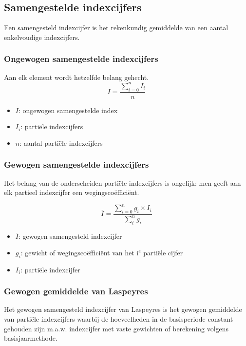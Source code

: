\documentclass[a4paper,12pt]{article}
\begin{document}
\subsection{Samengestelde indexcijfers}
Een samengesteld indexcijfer is het rekenkundig gemiddelde van een aantal enkelvoudige indexcijfers.

\subsubsection{Ongewogen samengestelde indexcijfers}
Aan elk element wordt hetzelfde belang gehecht.
\begin{equation}
\overline{I}=\frac{\sum^n_{i=0}I_i}{n}
\end{equation}
\begin{itemize}
\item $\overline{I}$: ongewogen samengestelde index
\item $I_i$: partiële indexcijfers
\item $n$: aantal partiële indexcijfers
\end{itemize}

\subsubsection{Gewogen samengestelde indexcijfers}
Het belang van de onderscheiden partiële indexcijfers is ongelijk:
men geeft aan elk partieel indexcijfer een wegingscoëfficiënt.

\begin{equation}
\overline{I}= \frac{\sum^n_{i=0}g_i \times I_i}{\sum^n_i g_i}
\end{equation}
\begin{itemize}
\item $\overline{I}$: gewogen samengesteld indexcijfer
\item $g_i$: gewicht of wegingscoëfficiënt van het i$^e$ partiële cijfer
\item $I_i$: partiële indexcijfer
\end{itemize}

\subsubsection{Gewogen gemiddelde van Laspeyres}
Het gewogen samengesteld indexcijfer van Laspeyres is het gewogen gemiddelde van partiële indexcijfers waarbij de
hoeveelheden in de basisperiode constant gehouden zijn m.a.w. indexcijfer met vaste gewichten of berekening volgens basisjaarmethode.
\end{document}
